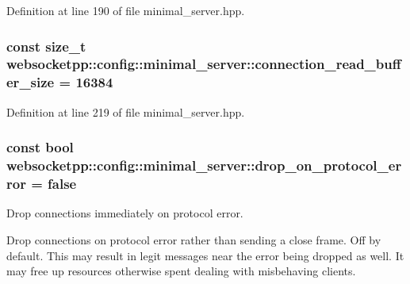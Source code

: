 Definition at line 190 of file minimal\+\_\+server.\+hpp.

\hypertarget{structwebsocketpp_1_1config_1_1minimal__server_a8fe8ba843966319a144337f8620648f3}{}
\subsubsection[{connection\+\_\+read\+\_\+buffer\+\_\+size}]{\setlength{\rightskip}{0pt plus 5cm}const size\+\_\+t websocketpp\+::config\+::minimal\+\_\+server\+::connection\+\_\+read\+\_\+buffer\+\_\+size = 16384\hspace{0.3cm}{\ttfamily [static]}}\label{structwebsocketpp_1_1config_1_1minimal__server_a8fe8ba843966319a144337f8620648f3}


Definition at line 219 of file minimal\+\_\+server.\+hpp.

\hypertarget{structwebsocketpp_1_1config_1_1minimal__server_aab09bf45ad78310426a04636ad64c2bd}{}
\subsubsection[{drop\+\_\+on\+\_\+protocol\+\_\+error}]{\setlength{\rightskip}{0pt plus 5cm}const bool websocketpp\+::config\+::minimal\+\_\+server\+::drop\+\_\+on\+\_\+protocol\+\_\+error = false\hspace{0.3cm}{\ttfamily [static]}}\label{structwebsocketpp_1_1config_1_1minimal__server_aab09bf45ad78310426a04636ad64c2bd}


Drop connections immediately on protocol error. 

Drop connections on protocol error rather than sending a close frame. Off by default. This may result in legit messages near the error being dropped as well. It may free up resources otherwise spent dealing with misbehaving clients. 

